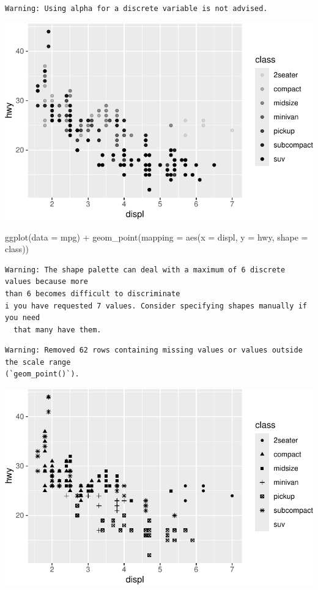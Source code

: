 \documentclass[
  letterpaper,
  DIV=11,
  numbers=noendperiod]{scrreprt}
\newenvironment{Shaded}{\begin{snugshade}}{\end{snugshade}}
\newcommand{\AttributeTok}[1]{\textcolor[rgb]{0.40,0.45,0.13}{#1}}
\newcommand{\FunctionTok}[1]{\textcolor[rgb]{0.28,0.35,0.67}{#1}}
\newcommand{\NormalTok}[1]{\textcolor[rgb]{0.00,0.23,0.31}{#1}}
\newcommand{\SpecialCharTok}[1]{\textcolor[rgb]{0.37,0.37,0.37}{#1}}
\begin{document}
\begin{verbatim}
Warning: Using alpha for a discrete variable is not advised.
\end{verbatim}

\includegraphics{Beginning_Data_Visualization_files/figure-pdf/Example 3-1.pdf}

\begin{Shaded}
\begin{Highlighting}[]
\FunctionTok{ggplot}\NormalTok{(}\AttributeTok{data =}\NormalTok{ mpg) }\SpecialCharTok{+} 
  \FunctionTok{geom\_point}\NormalTok{(}\AttributeTok{mapping =} \FunctionTok{aes}\NormalTok{(}\AttributeTok{x =}\NormalTok{ displ, }\AttributeTok{y =}\NormalTok{ hwy, }\AttributeTok{shape =}\NormalTok{ class))}
\end{Highlighting}
\end{Shaded}

\begin{verbatim}
Warning: The shape palette can deal with a maximum of 6 discrete values because more
than 6 becomes difficult to discriminate
i you have requested 7 values. Consider specifying shapes manually if you need
  that many have them.
\end{verbatim}

\begin{verbatim}
Warning: Removed 62 rows containing missing values or values outside the scale range
(`geom_point()`).
\end{verbatim}

\includegraphics{Beginning_Data_Visualization_files/figure-pdf/Example 3-2.pdf}
\end{document}
